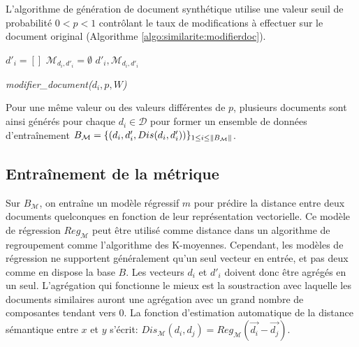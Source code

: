 L'algorithme de génération de document synthétique utilise une valeur seuil de probabilité $0<p<1$ contrôlant le taux de modifications à effectuer sur le document original (Algorithme \ref{algo:similarite:modifierdoc}). 

\begin{algorithm}[!htb] %
 ${d'_i} = [] $\; 
 $\mathcal{M}_{d_i, d'_i} = \emptyset$\;
 \Return $d'_i, \mathcal{M}_{d_i, d'_i}$\;
 \caption{\textit{modifier\_document($d_i, p, W$)}} \label{algo:similarite:modifierdoc}
\end{algorithm}

Pour une même valeur ou des valeurs différentes de $p$, plusieurs documents sont ainsi générés pour chaque $d_i \in \mathcal{D}$ pour former un ensemble de données d'entraînement $B_\mathcal{M} = \lbrace (d_i, d'_i, {Dis}(d_i, d'_i))\rbrace_{1 \leq i \leq \left\lVert B_\mathcal{M}\right\rVert}$.

\subsection{Entraînement de la métrique}

Sur $B_\mathcal{M}$, on entraîne un modèle régressif $m$ pour prédire la distance entre deux documents quelconques en fonction de leur représentation vectorielle. Ce modèle de régression $Reg_\mathcal{M}$ peut être utilisé comme distance dans un algorithme de regroupement comme l'algorithme des K-moyennes. Cependant, les modèles de régression ne supportent généralement qu'un seul vecteur en entrée, et pas deux comme en dispose la base $B$. Les vecteurs $d_i$ et $d'_i$ doivent donc être agrégés en un seul. L'agrégation qui fonctionne le mieux est la soustraction avec laquelle les documents similaires auront une agrégation avec un grand nombre de composantes tendant vers 0. La fonction d'estimation automatique de la distance sémantique entre $x$ et $y$ s'écrit: $Dis_\mathcal{M}(d_i, d_j) = Reg_\mathcal{M}(\vec{d_{i}} - \vec{d_{j}})$. 


